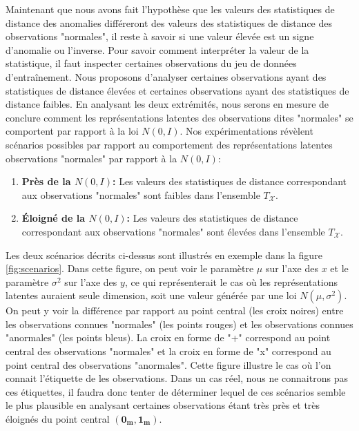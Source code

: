  Maintenant que nous avons fait l'hypothèse que les valeurs des statistiques de distance des anomalies différeront des valeurs des statistiques de distance des observations "normales", il reste à savoir si une valeur élevée est un signe d'anomalie ou l'inverse. Pour savoir comment interpréter la valeur de la statistique, il faut inspecter certaines observations du jeu de données d'entraînement. Nous proposons d'analyser certaines observations ayant des statistiques de distance élevées et certaines observations ayant des statistiques de distance faibles. En analysant les deux extrémités, nous serons en mesure de conclure comment les représentations latentes des observations dites "normales" se comportent par rapport à la loi $N(0,I)$. Nos expérimentations révèlent \DIFdelbegin {}\DIFdelend \DIFaddbegin {}\DIFaddend scénarios possibles par rapport au comportement des représentations latentes observations "normales" par rapport à la $N(0,I)$:

\begin{enumerate} \label{liste_scenarios}
	\item \textbf{Près de la $N(0,I)$:} Les valeurs des statistiques de distance correspondant aux observations "normales" sont faibles dans l'ensemble $T_{\mathcal{X}}$.
	\item \textbf{Éloigné de la $N(0,I)$:} Les valeurs des statistiques de distance correspondant aux observations "normales" sont élevées dans l'ensemble $T_{\mathcal{X}}$.
\end{enumerate}

Les deux scénarios décrits ci-dessus sont illustrés en exemple dans la figure \ref{fig:scenarios}. Dans cette figure, on peut voir le paramètre $\mu$ sur l'axe des $x$ et le paramètre $\sigma^2$ sur l'axe des $y$, ce qui représenterait le cas où les représentations latentes auraient \DIFdelbegin {}\DIFdelend \DIFaddbegin {}\DIFaddend seule dimension, soit une valeur générée par une loi $N(\mu, \sigma^2)$. On peut y voir la différence par rapport au point central (les \DIFdelbegin {}\DIFdelend \DIFaddbegin {}\DIFaddend croix noires) entre les observations connues "normales" (les points rouges) et les observations connues "anormales" (les points bleus).  La croix en forme de "+" correspond au point central des observations "normales" et la croix en forme de "x" correspond au point central des observations "anormales". Cette figure illustre le cas où l'on connait l'étiquette de \DIFdelbegin {}\DIFdelend \DIFaddbegin {}\DIFaddend les observations. Dans un cas réel, nous ne connaitrons pas ces étiquettes, il faudra donc tenter de déterminer lequel de ces \DIFdelbegin {}\DIFdelend \DIFaddbegin {}\DIFaddend scénarios semble le plus plausible en analysant certaines observations étant très près et très éloignés du point central $(\boldsymbol{0_m}, \boldsymbol{1_m})$.

